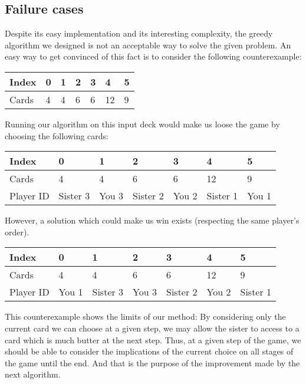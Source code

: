 \documentclass[a4paper,10pt]{article}
\begin{document}
    \subsection{Failure cases}
    Despite its easy implementation and its interesting complexity, the greedy algorithm we designed is not an acceptable way to solve the given problem.\newline
    An easy way to get convinced of this fact is to consider the following counterexample:\newline
    \begin{tabular}{| L{2cm} || C{1cm} | C{1cm} | C{1cm} | C{1cm} | C{1cm} | C{1cm} |}
      \hline Index & 0 & 1 & 2 & 3 & 4 & 5 \\
      \hline Cards & 4 & 4 & 6 & 6 & 12 & 9 \\
      \hline
    \end{tabular}
    \newline
    \newline
    Running our algorithm on this input deck would make us loose the game by choosing the following cards:\newline
    \begin{tabular}{| L{2cm} || C{2cm} | C{2cm} | C{2cm} | C{2cm} | C{2cm} | C{2cm} |}
      \hline Index & 0 & 1 & 2 & 3 & 4 & 5 \\
      \hline Cards & 4 & 4 & 6 & 6 & 12 & 9 \\
      \hline Player ID & Sister 3  & You 3 & Sister 2 & You 2 & Sister 1 & You 1\\
      \hline
    \end{tabular}
    \newline
    \newline
    However, a solution which could make us win exists (respecting the same player's order).\newline
    \begin{tabular}{| L{2cm} || C{2cm} | C{2cm} | C{2cm} | C{2cm} | C{2cm} | C{2cm} |}
      \hline Index & 0 & 1 & 2 & 3 & 4 & 5 \\
      \hline Cards & 4 & 4 & 6 & 6 & 12 & 9 \\
      \hline Player ID & You 1  & Sister 3 & You 3 & Sister 2 & You 2 & Sister 1\\
      \hline
    \end{tabular}
    \newline
    \newline
    This counterexample shows the limits of our method: By considering only the current card we can choose at a given step, we may allow the sister to access to a card which is much butter at the next step.\newline
    Thus, at a given step of the game, we should be able to consider the implications of the current choice on all stages of the game until the end.
    And that is the purpose of the improvement made by the next algorithm.
\end{document}
